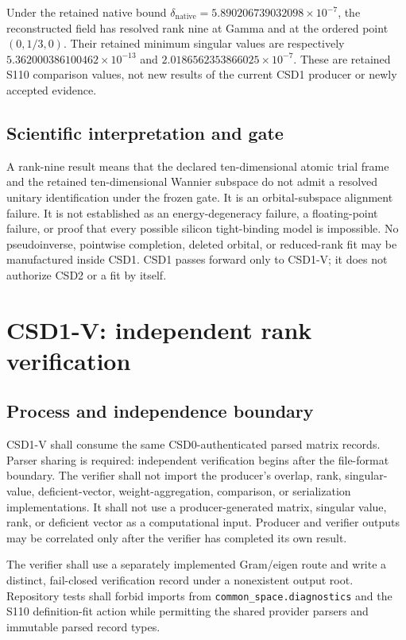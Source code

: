 \documentclass[11pt]{report}
\begin{document}
Under the retained native bound
$\delta_{\mathrm{native}}=5.890206739032098\times10^{-7}$, the reconstructed field has
resolved rank nine at Gamma and at the ordered point $(0,1/3,0)$.  Their retained
minimum singular values are respectively
$5.362000386100462\times10^{-13}$ and
$2.0186562353866025\times10^{-7}$.  These are retained S110 comparison values, not
new results of the current CSD1 producer or newly accepted evidence.

\section{Scientific interpretation and gate}

A rank-nine result means that the declared ten-dimensional atomic trial frame and the
retained ten-dimensional Wannier subspace do not admit a resolved unitary
identification under the frozen gate.  It is an orbital-subspace alignment failure.  It
is not established as an energy-degeneracy failure, a floating-point failure, or proof
that every possible silicon tight-binding model is impossible.  No pseudoinverse,
pointwise completion, deleted orbital, or reduced-rank fit may be manufactured inside
CSD1.  CSD1 passes forward only to CSD1-V; it does not authorize CSD2 or a fit by itself.

\chapter{CSD1-V: independent rank verification}

\section{Process and independence boundary}

CSD1-V shall consume the same CSD0-authenticated parsed matrix records.  Parser sharing
is required: independent verification begins after the file-format boundary.  The
verifier shall not import the producer's overlap, rank, singular-value, deficient-vector,
weight-aggregation, comparison, or serialization implementations.  It shall not use a
producer-generated matrix, singular value, rank, or deficient vector as a computational
input.  Producer and verifier outputs may be correlated only after the verifier has
completed its own result.

The verifier shall use a separately implemented Gram/eigen route and write a distinct,
fail-closed verification record under a nonexistent output root.  Repository tests shall
forbid imports from \texttt{common\_space.diagnostics} and the S110 definition-fit
action while permitting the shared provider parsers and immutable parsed record types.
\end{document}
